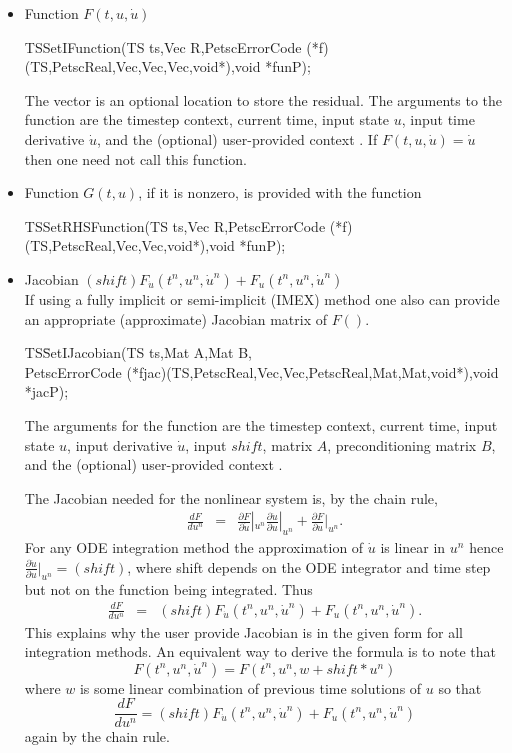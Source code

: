 \begin{itemize}
\item Function $F(t,u,\dot{u})$
  \begin{tabbing}
    TSSetIFunction(TS ts,Vec R,PetscErrorCode (*f)(TS,PetscReal,Vec,Vec,Vec,void*),void *funP);
  \end{tabbing}
  The vector  is an optional location to store the residual.
  The arguments to the function  are the
  timestep context, current time, input state $u$, input time derivative
  $\dot{u}$, and the (optional) user-provided context . If    $F(t,u,\dot{u}) = \dot{u} $ then
  one need not call this function.

\item Function $ G(t,u)$, if it is nonzero, is provided with the function
  \begin{tabbing}
    TSSetRHSFunction(TS ts,Vec R,PetscErrorCode (*f)(TS,PetscReal,Vec,Vec,void*),void *funP);
  \end{tabbing}

\item Jacobian $ (shift) F_{\dot{u}}(t^n,u^n,\dot{u}^n) + F_u(t^n,u^n,\dot{u}^n) $ \\
  If using a fully implicit or semi-implicit (IMEX) method one also can provide an appropriate (approximate) Jacobian matrix of $F()$.
  \begin{tabbing}
    TS\=SetIJacobian(TS ts,Mat A,Mat B,\\
    \>PetscErrorCode (*fjac)(TS,PetscReal,Vec,Vec,PetscReal,Mat,Mat,void*),void *jacP);
  \end{tabbing}
  The arguments for the function 
  are the timestep context, current time, input state $u$, input
  derivative $\dot{u}$, input $shift$, matrix $A$, preconditioning matrix
  $B$, and the (optional) user-provided context .

  The Jacobian needed for the nonlinear system is, by the chain rule,
\begin{eqnarray*}
    \frac{d F}{d u^n} &  = &  \frac{\partial F}{\partial \dot{u}}|_{u^n} \frac{\partial \dot{u}}{\partial u}|_{u^n} + \frac{\partial F}{\partial u}|_{u^n}.
\end{eqnarray*}
For any ODE integration method the approximation of $ \dot{u} $ is linear in $ u^n$ hence $ \frac{\partial \dot{u}}{\partial u}|_{u^n} = (shift) $, where shift depends on the
ODE integrator and time step but not on the function being integrated. Thus
\begin{eqnarray*}
    \frac{d F}{d u^n} &  = &    (shift) F_{\dot{u}}(t^n,u^n,\dot{u}^n) + F_u(t^n,u^n,\dot{u}^n).
\end{eqnarray*}
This explains why the user provide Jacobian is in the given form for all integration methods. An equivalent way to derive the formula is to note that
\[
   F(t^n,u^n,\dot{u}^n) = F(t^n,u^n,w+shift*u^n)
\]
where $ w $ is some linear combination of previous time solutions of $u$ so that
\[
\frac{d F}{d u^n} = (shift) F_{\dot{u}}(t^n,u^n,\dot{u}^n) + F_u(t^n,u^n,\dot{u}^n)
\]
again by the chain rule.


\end{itemize}
